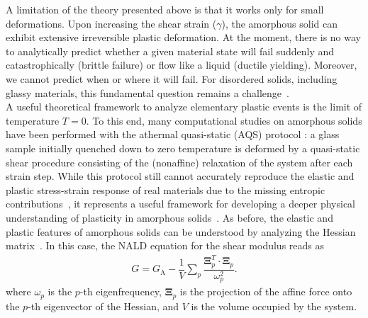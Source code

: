 \documentclass[pre,twocolumn,aps,superscriptaddress,showpacs]{revtex4-1}
\begin{document}
A limitation of the theory presented above is that it works only for small deformations. Upon increasing the shear strain ($\gamma$), the amorphous solid can exhibit extensive irreversible plastic deformation. At the moment, there is no way to analytically predict whether a given material state will fail suddenly and catastrophically (brittle failure) or flow like a liquid (ductile yielding). Moreover, we cannot predict when or where it will fail. For disordered solids, including glassy materials, this fundamental question remains a challenge~\cite{Falk_review,Barrat_review,Arratia}. 
  \\

A useful theoretical framework to analyze elementary plastic events is the limit of temperature $T = 0$. To this end, many computational studies on amorphous solids have been performed with the athermal quasi-static (AQS) protocol \cite{Maloney}:  a glass sample initially quenched down to zero temperature is deformed by a quasi-static shear procedure consisting of the (nonaffine) relaxation of the system after each strain step. While this protocol still cannot accurately reproduce the elastic and plastic stress-strain response of real materials due to the missing entropic contributions~\cite{Suter,Rutledge,Sirk2016}, it represents a useful framework for developing a deeper physical understanding of plasticity in amorphous solids~\cite{Manning2020}. As before, the elastic and plastic features of amorphous solids can be understood by analyzing the Hessian matrix~\cite{Manning2020}. In this case, the NALD equation for the shear modulus reads as \cite{Lemaitre2006,ZacconeScossa2011}
\begin{eqnarray}\label{complexmodulus}
G=G_\text{A}-\dfrac{1}{V} \sum_{p}\dfrac{\mathbf{\Xi}^T_p  \cdot \mathbf{\Xi}_p }{ \omega_p^2}.
\label{complexmodulus}
\end{eqnarray}
where ${\omega_p}$ is the $p$-th eigenfrequency, $\mathbf{\Xi}_p$ is the projection of the affine force onto the $p$-th eigenvector of the Hessian, and $V$ is the volume occupied by the system.
\end{document}
